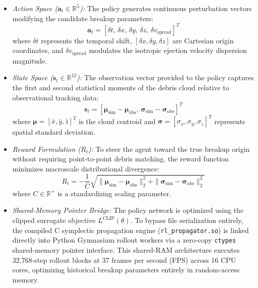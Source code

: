 \begin{itemize}
    \item \textit{Action Space ($\mathbf{a}_t \in \mathbb{R}^5$):} The policy generates continuous perturbation vectors modifying the candidate breakup parameters:
    \begin{equation}
    \mathbf{a}_t = [\delta t, \, \delta x, \, \delta y, \, \delta z, \, \delta v_{\text{spread}}]^T
    \label{eq:ppo_action}
    \end{equation}
    where $\delta t$ represents the temporal shift, $[\delta x, \delta y, \delta z]$ are Cartesian origin coordinates, and $\delta v_{\text{spread}}$ modulates the isotropic ejection velocity dispersion magnitude.
    \item \textit{State Space ($\mathbf{s}_t \in \mathbb{R}^{12}$):} The observation vector provided to the policy captures the first and second statistical moments of the debris cloud relative to observational tracking data:
    \begin{equation}
    \mathbf{s}_t = [\boldsymbol{\mu}_{\text{sim}} - \boldsymbol{\mu}_{\text{obs}}, \, \boldsymbol{\sigma}_{\text{sim}} - \boldsymbol{\sigma}_{\text{obs}}]^T
    \label{eq:ppo_state}
    \end{equation}
    where $\boldsymbol{\mu} = [\bar{x}, \bar{y}, \bar{z}]^T$ is the cloud centroid and $\boldsymbol{\sigma} = [\sigma_x, \sigma_y, \sigma_z]^T$ represents spatial standard deviation.
    \item \textit{Reward Formulation ($R_t$):} To steer the agent toward the true breakup origin without requiring point-to-point debris matching, the reward function minimizes macroscale distributional divergence:
    \begin{equation}
    R_t = -\frac{1}{C} \sqrt{ \|\boldsymbol{\mu}_{\text{sim}} - \boldsymbol{\mu}_{\text{obs}}\|_2^2 + \|\boldsymbol{\sigma}_{\text{sim}} - \boldsymbol{\sigma}_{\text{obs}}\|_2^2 }
    \label{eq:ppo_reward}
    \end{equation}
    where $C \in \mathbb{R}^+$ is a standardizing scaling parameter.
    \item \textit{Shared-Memory Pointer Bridge:} The policy network is optimized using the clipped surrogate objective $L^{\text{CLIP}}(\theta)$. To bypass file serialization entirely, the compiled C symplectic propagation engine (\texttt{rl\_propagator.so}) is linked directly into Python Gymnasium rollout workers via a zero-copy \texttt{ctypes} shared-memory pointer interface. This shared-RAM architecture executes 32,768-step rollout blocks at 37 frames per second (FPS) across 16 CPU cores, optimizing historical breakup parameters entirely in random-access memory.
\end{itemize}

